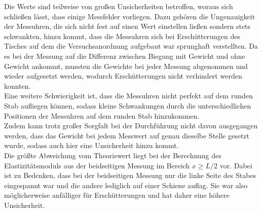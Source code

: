 \noindent Die Werte sind teilweise von großen Unsicherheiten betroffen, woraus sich schließen lässt, dass einige Messfehler vorliegen. Dazu gehören die Ungenauigkeit der Messuhren,
die sich nicht fest auf einen Wert einstellen ließen sondern stets schwankten, hinzu kommt, dass die Messuhren sich bei Erschütterungen
des Tisches auf dem die Versuchsanordnung aufgebaut war sprunghaft verstellten. Da es bei der Messung auf die Differenz zwischen Biegung mit Gewicht und ohne Gewicht 
ankommt, mussten die Gewichte bei jeder Messung abgenommen und wieder aufgesetzt werden, wodurch Erschütterungen nicht verhindert werden konnten.\\
Eine weitere Schwierigkeit ist, dass die Messuhren nicht perfekt auf dem runden Stab aufliegen können, sodass kleine Schwankungen durch die unterschiedlichen Positionen der 
Messuhren auf dem runden Stab hinzukommen.\\
Zudem kann trotz großer Sorgfalt bei der Durchführung nicht davon ausgegangen werden, dass das Gewicht bei jedem Messwert auf genau dieselbe Stelle 
gesetzt wurde, sodass auch hier eine Unsicherheit hinzu kommt. \\
Die größte Abweichung vom Theoriewert liegt bei der Berechnung des Elastizitätsmoduls aus der beidseitigen Messung im Bereich $x \geq L/2$ vor. 
Dabei ist zu Bedenken, dass bei der beidseitigen Messung nur die linke Seite des Stabes eingespannt war und die andere lediglich auf einer Schiene auflag. Sie war also 
möglicherweise anfälliger für Erschütterungen und hat daher eine höhere Unsicherheit.\\